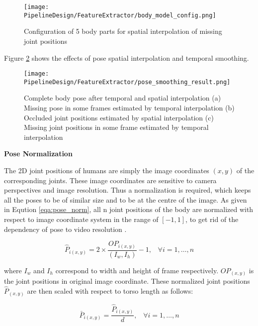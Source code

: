 \begin{figure}[h!]
  \centering
  \texttt{[image: PipelineDesign/FeatureExtractor/body\_model\_config.png]}
  \caption{Configuration of 5 body parts for spatial interpolation of missing joint positions
           \cite{usman2018}}
  \label{fig:body_model_config}
\end{figure} 

Figure \ref{fig:pose_smoothing_result} shows the effects of pose spatial interpolation and temporal smoothing.

\begin{figure}[h!]
  \centering
  \texttt{[image: PipelineDesign/FeatureExtractor/pose\_smoothing\_result.png]}
  \caption{Complete body pose after temporal and spatial interpolation (a) Missing pose in some frames
           estimated by temporal interpolation (b) Occluded joint positions estimated by spatial
           interpolation (c) Missing joint positions in some frame estimated by temporal interpolation
           \cite{usman2018}}
  \label{fig:pose_smoothing_result}
\end{figure} 

\textbf{Pose Normalization} 

The 2D joint positions of humans are simply the image coordinates $(x, y)$ of the corresponding joints. These image coordinates are sensitive to camera perspectives and image resolution. Thus a normalization is required, which keeps all the poses to be of similar size and to be at the centre of the image. As given in Eqution \ref{eqa:pose_norm}, all n joint positions of the body are normalized with respect to image coordinate system in the range of $[-1, 1]$, to get rid of the dependency of pose to video resolution \cite{usman2018}.

\begin{equation}
\hat{P}_{i(x,y)} = 2 \times \frac{OP_{i(x,y)}}{(I_{w}, I_{h})} - 1, \;\;\; \forall i = 1, \dots , n
\label{eqa:pose_norm}
\end{equation}

where $I_{w}$ and $I_{h}$ correspond to width and height of frame respectively. $OP_{(x,y)}$ is the
joint positions in original image coordinate. These normalized joint positions $\hat{P}_{(x,y)}$ are then scaled with respect to torso length as follows: 

\begin{equation}
\bar{P}_{i(x,y)} = \frac{\hat{P}_{i(x,y)}}{d}, \;\;\; \forall i = 1, \dots, n
\end{equation}

